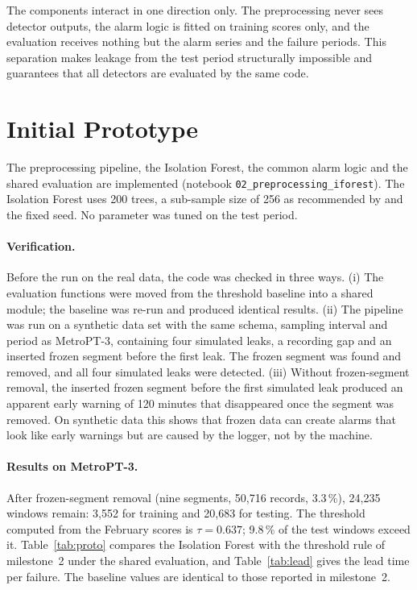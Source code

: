 The components interact in one direction only. The preprocessing never sees detector outputs, the alarm logic is fitted on training scores only, and the evaluation receives nothing but the alarm series and the failure periods. This separation makes leakage from the test period structurally impossible and guarantees that all detectors are evaluated by the same code.

\section{Initial Prototype}
\label{sec:prototype}
The preprocessing pipeline, the Isolation Forest, the common alarm logic and the shared evaluation are implemented (notebook \texttt{02\_preprocessing\_iforest}). The Isolation Forest uses 200 trees, a sub-sample size of 256 as recommended by \citet{liu2008isolation} and the fixed seed. No parameter was tuned on the test period.

\paragraph{Verification.} Before the run on the real data, the code was checked in three ways. (i) The evaluation functions were moved from the threshold baseline into a shared module; the baseline was re-run and produced identical results. (ii) The pipeline was run on a synthetic data set with the same schema, sampling interval and period as MetroPT-3, containing four simulated leaks, a recording gap and an inserted frozen segment before the first leak. The frozen segment was found and removed, and all four simulated leaks were detected. (iii) Without frozen-segment removal, the inserted frozen segment before the first simulated leak produced an apparent early warning of 120 minutes that disappeared once the segment was removed. On synthetic data this shows that frozen data can create alarms that look like early warnings but are caused by the logger, not by the machine.

\paragraph{Results on MetroPT-3.} After frozen-segment removal (nine segments, 50{,}716 records, 3.3\,\%), 24{,}235 windows remain: 3{,}552 for training and 20{,}683 for testing. The threshold computed from the February scores is $\tau=0.637$; 9.8\,\% of the test windows exceed it. Table~\ref{tab:proto} compares the Isolation Forest with the threshold rule of milestone~2 under the shared evaluation, and Table~\ref{tab:lead} gives the lead time per failure. The baseline values are identical to those reported in milestone~2.

